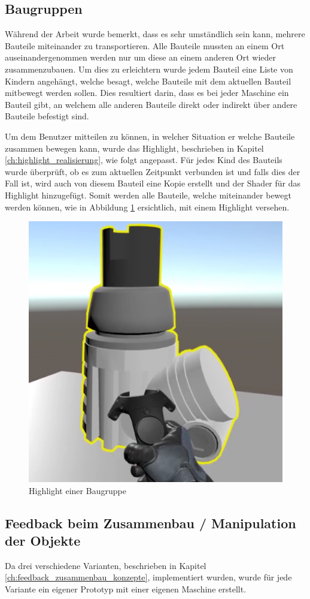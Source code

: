 \subsection{Baugruppen}
\label{ch:baugruppen}
Während der Arbeit wurde bemerkt, dass es sehr umständlich sein kann, mehrere Bauteile miteinander zu transportieren. Alle Bauteile mussten an einem Ort auseinandergenommen werden nur um diese an einem anderen Ort wieder zusammenzubauen. Um dies zu erleichtern wurde jedem Bauteil eine Liste von Kindern angehängt, welche besagt, welche Bauteile mit dem aktuellen Bauteil mitbewegt werden sollen. Dies resultiert darin, dass es bei jeder Maschine ein Bauteil gibt, an welchem alle anderen Bauteile direkt oder indirekt über andere Bauteile befestigt sind.

Um dem Benutzer mitteilen zu können, in welcher Situation er welche Bauteile zusammen bewegen kann, wurde das Highlight, beschrieben in Kapitel \ref{ch:highlight_realisierung}, wie folgt angepasst. Für jedes Kind des Bauteils wurde überprüft, ob es zum aktuellen Zeitpunkt verbunden ist und falls dies der Fall ist, wird auch von diesem Bauteil eine Kopie erstellt und der Shader für das Highlight hinzugefügt. Somit werden alle Bauteile, welche miteinander bewegt werden können, wie in Abbildung \ref{fig:highlight_baugruppe} ersichtlich, mit einem Highlight versehen.

\begin{figure}[h!]
	\centering
	\includegraphics[keepaspectratio,width=0.37\linewidth]{img/Baugruppe_Highlight.PNG}
	\caption{Highlight einer Baugruppe}
	\label{fig:highlight_baugruppe}
\end{figure}

\subsection{Feedback beim Zusammenbau / Manipulation der Objekte}
\label{ch:feedback_zusammenbau_manipulation}

Da drei verschiedene Varianten, beschrieben in Kapitel \ref{ch:feedback_zusammenbau_konzepte}, implementiert wurden, wurde für jede Variante ein eigener Prototyp mit einer eigenen Maschine erstellt. \\


